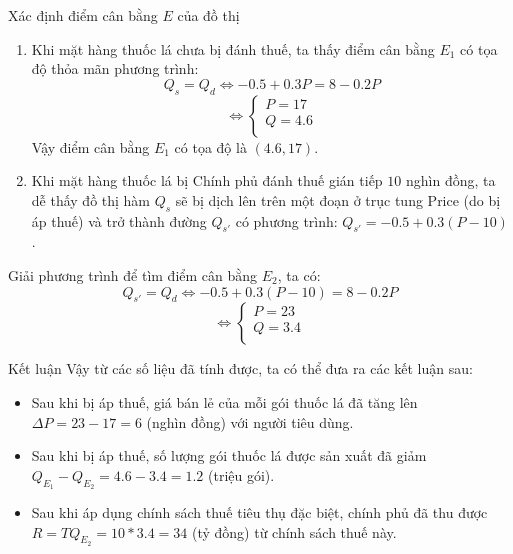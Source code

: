 \documentclass[11pt,aspectratio=169]{beamer}
\begin{document}
\begin{frame}{Xác định điểm cân bằng $E$ của đồ thị}
\begin{enumerate}
    \item Khi mặt hàng thuốc lá chưa bị đánh thuế, ta thấy điểm cân bằng $E_{1}$ có tọa độ thỏa mãn phương trình:
$$Q_{s}=Q_{d} \Leftrightarrow -0.5+0.3P=8-0.2P$$
\begin{equation*}
    \Leftrightarrow
    \begin{cases}
    P=17\\
    Q=4.6\\
    \end{cases}
    \end{equation*}
    Vậy điểm cân bằng $E_{1}$ có tọa độ là $(4.6, 17)$.
    \item Khi mặt hàng thuốc lá bị Chính phủ đánh thuế gián tiếp $10$ nghìn đồng, ta dễ thấy đồ thị hàm $Q_{s}$ sẽ bị dịch lên trên một đoạn ở trục tung Price (do bị áp thuế) và trở
thành đường $Q_{s'}$ có phương trình: $Q_{s'}=-0.5+0.3(P-10)$.
\end{enumerate}
\end{frame}
\begin{frame}
Giải phương trình để tìm điểm cân bằng $E_{2}$, ta có:
$$Q_{s'}=Q_{d}\Leftrightarrow -0.5+0.3(P-10)=8-0.2P$$
\begin{equation*}
    \Leftrightarrow
    \begin{cases}
    P=23\\
    Q=3.4\\
    \end{cases}
    \end{equation*}
\end{frame}
\begin{frame}{Kết luận}
Vậy từ các số liệu đã tính được, ta có thể đưa ra các kết luận sau:
\begin{itemize}
    \item Sau khi bị áp thuế, giá bán lẻ của mỗi gói thuốc lá đã tăng lên $\Delta P=23-17=6$ (nghìn đồng) với người tiêu dùng.
    \item Sau khi bị áp thuế, số lượng gói thuốc lá được sản xuất đã giảm $Q_{E_{1}}-Q_{E_{2}}=4.6-3.4=1.2$ (triệu gói).
    \item Sau khi áp dụng chính sách thuế tiêu thụ đặc biệt, chính phủ đã thu được $R=TQ_{E_{2}}=10*3.4=34$ (tỷ đồng) từ chính sách thuế này.
\end{itemize}
\end{frame}
\begin{frame}
    
\end{frame}
\end{document}
